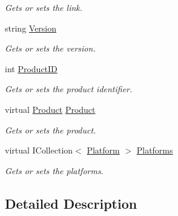 \begin{DoxyCompactItemize}
\begin{DoxyCompactList}\small\item\em Gets or sets the link. \end{DoxyCompactList}\item 
string \hyperlink{class_open_1_1_g_i_1_1hypermart_1_1_data_transformation_objects_1_1_file_d_t_o_ac55a6e7062078277eed54e42b7c29d73}{Version}
\begin{DoxyCompactList}\small\item\em Gets or sets the version. \end{DoxyCompactList}\item 
int \hyperlink{class_open_1_1_g_i_1_1hypermart_1_1_data_transformation_objects_1_1_file_d_t_o_abd8d9083fbb95dac1e2781f2a8d4f8e9}{Product\+I\+D}
\begin{DoxyCompactList}\small\item\em Gets or sets the product identifier. \end{DoxyCompactList}\item 
virtual \hyperlink{class_open_1_1_g_i_1_1hypermart_1_1_models_1_1_product}{Product} \hyperlink{class_open_1_1_g_i_1_1hypermart_1_1_data_transformation_objects_1_1_file_d_t_o_aa587dd986d4c6d62d8bf5520d3a48e79}{Product}
\begin{DoxyCompactList}\small\item\em Gets or sets the product. \end{DoxyCompactList}\item 
virtual I\+Collection$<$ \hyperlink{class_open_1_1_g_i_1_1hypermart_1_1_models_1_1_platform}{Platform} $>$ \hyperlink{class_open_1_1_g_i_1_1hypermart_1_1_data_transformation_objects_1_1_file_d_t_o_a784824c36cab74d3bc03a8ae55d9a62a}{Platforms}
\begin{DoxyCompactList}\small\item\em Gets or sets the platforms. \end{DoxyCompactList}\end{DoxyCompactItemize}


\subsection{Detailed Description}




